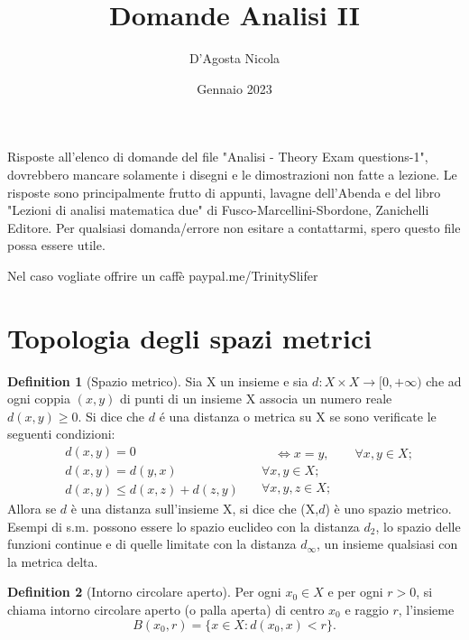 \documentclass[leqno]{article}
\theoremstyle{definition}
\newtheorem{definition}{Definition}[section]
\numberwithin{equation}{section}
\theoremstyle{remark}
\begin{document}
	
	\title{Domande Analisi II}
	\author{D'Agosta Nicola}
	\date{Gennaio 2023}
	\maketitle
	\vspace{8.0cm}
	
	
	Risposte all'elenco di domande del file "Analisi - Theory Exam questions-1", dovrebbero mancare solamente i disegni e le dimostrazioni non fatte a lezione. Le risposte sono principalmente frutto di appunti, lavagne dell'Abenda e del libro "Lezioni di analisi matematica due" di Fusco-Marcellini-Sbordone, Zanichelli Editore. Per qualsiasi domanda/errore non esitare a contattarmi, spero questo file possa essere utile. 
	
	\vspace{1.0cm}
	
	Nel caso vogliate offrire un caffè paypal.me/TrinitySlifer
	\newpage
	\tableofcontents 
	\newpage
	
	
	
	\section{Topologia degli spazi metrici}
	\begin{definition}[Spazio metrico]
		Sia X un insieme e sia $d:X\times X \rightarrow [0,+ \infty)$ che ad ogni coppia $(x,y)$ di punti di un insieme X associa un numero reale $d(x,y)\ge 0$. Si dice che $d$ é una distanza o metrica su X se sono verificate le seguenti condizioni: 
		\begin{equation} 
			\begin{split}
				&d(x,y) = 0 \\
				&d(x,y)=d(y,x)\\
				&d(x,y)\le d(x,z) + d(z,y)
			\end{split}
			\quad
			\begin{split}
				\quad \Leftrightarrow x = y, \quad \quad \forall x,y \in X; \\
				\forall x,y \in X;\\
				\forall x,y,z \in X;
			\end{split}
		\end{equation}
		Allora se $d$ è una distanza sull'insieme X, si dice che (X,$d$) è uno spazio metrico. Esempi di s.m. possono essere lo spazio euclideo con la distanza $d_2$, lo spazio delle funzioni continue e di quelle limitate con la distanza $d_\infty$, un insieme qualsiasi con la metrica delta.
	\end{definition}
	\begin{definition}[Intorno circolare aperto]
		Per ogni $x_0\in X$ e per ogni $r > 0 $, si chiama intorno circolare aperto (o palla aperta) di centro $x_0$ e raggio $r$, l'insieme
		\begin{equation}
			B(x_0,r)=\{x \in X : d(x_0,x)< r\}.
		\end{equation}
	\end{definition}
	
\end{document}
